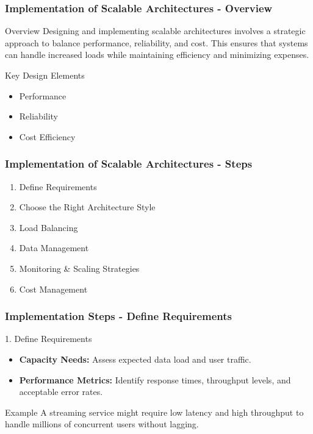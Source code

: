 \documentclass{beamer}
\begin{document}
\begin{frame}[fragile]
    \frametitle{Implementation of Scalable Architectures - Overview}
    \begin{block}{Overview}
        Designing and implementing scalable architectures involves a strategic approach to balance performance, reliability, and cost. This ensures that systems can handle increased loads while maintaining efficiency and minimizing expenses.
    \end{block}
    \begin{block}{Key Design Elements}
        \begin{itemize}
            \item Performance
            \item Reliability
            \item Cost Efficiency
        \end{itemize}
    \end{block}
\end{frame}

\begin{frame}[fragile]
    \frametitle{Implementation of Scalable Architectures - Steps}
    \begin{enumerate}
        \item Define Requirements
        \item Choose the Right Architecture Style
        \item Load Balancing
        \item Data Management
        \item Monitoring \& Scaling Strategies
        \item Cost Management
    \end{enumerate}
\end{frame}

\begin{frame}[fragile]
    \frametitle{Implementation Steps - Define Requirements}
    \begin{block}{1. Define Requirements}
        \begin{itemize}
            \item \textbf{Capacity Needs:} Assess expected data load and user traffic.
            \item \textbf{Performance Metrics:} Identify response times, throughput levels, and acceptable error rates.
        \end{itemize}
        \begin{block}{Example}
            A streaming service might require low latency and high throughput to handle millions of concurrent users without lagging.
        \end{block}
    \end{block}
\end{frame}
\end{document}
